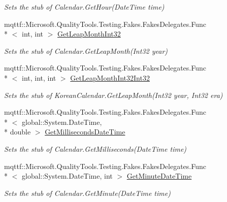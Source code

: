 \begin{DoxyCompactItemize}
\begin{DoxyCompactList}\small\item\em Sets the stub of Calendar.\-Get\-Hour(\-Date\-Time time)\end{DoxyCompactList}\item 
mqttf\-::\-Microsoft.\-Quality\-Tools.\-Testing.\-Fakes.\-Fakes\-Delegates.\-Func\\*
$<$ int, int $>$ \hyperlink{class_system_1_1_globalization_1_1_fakes_1_1_stub_korean_calendar_a69e4b15b410da49df95bcc35bb71b6fd}{Get\-Leap\-Month\-Int32}
\begin{DoxyCompactList}\small\item\em Sets the stub of Calendar.\-Get\-Leap\-Month(\-Int32 year)\end{DoxyCompactList}\item 
mqttf\-::\-Microsoft.\-Quality\-Tools.\-Testing.\-Fakes.\-Fakes\-Delegates.\-Func\\*
$<$ int, int, int $>$ \hyperlink{class_system_1_1_globalization_1_1_fakes_1_1_stub_korean_calendar_a822786c0b23228c16d4ecb9941bca6e2}{Get\-Leap\-Month\-Int32\-Int32}
\begin{DoxyCompactList}\small\item\em Sets the stub of Korean\-Calendar.\-Get\-Leap\-Month(\-Int32 year, Int32 era)\end{DoxyCompactList}\item 
mqttf\-::\-Microsoft.\-Quality\-Tools.\-Testing.\-Fakes.\-Fakes\-Delegates.\-Func\\*
$<$ global\-::\-System.\-Date\-Time, \\*
double $>$ \hyperlink{class_system_1_1_globalization_1_1_fakes_1_1_stub_korean_calendar_abd8ba69c37df104c08fa0d15a32cbdc8}{Get\-Milliseconds\-Date\-Time}
\begin{DoxyCompactList}\small\item\em Sets the stub of Calendar.\-Get\-Milliseconds(\-Date\-Time time)\end{DoxyCompactList}\item 
mqttf\-::\-Microsoft.\-Quality\-Tools.\-Testing.\-Fakes.\-Fakes\-Delegates.\-Func\\*
$<$ global\-::\-System.\-Date\-Time, int $>$ \hyperlink{class_system_1_1_globalization_1_1_fakes_1_1_stub_korean_calendar_a38ffce7d8e73044307fcde26eace1038}{Get\-Minute\-Date\-Time}
\begin{DoxyCompactList}\small\item\em Sets the stub of Calendar.\-Get\-Minute(\-Date\-Time time)\end{DoxyCompactList}\item 

\end{DoxyCompactItemize}
